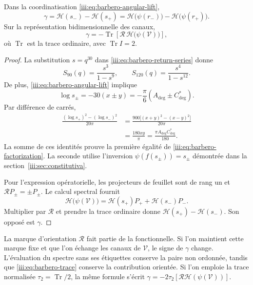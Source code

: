 \begin{theorem}
\label{iii:thm:barbero-factorization}
Dans la coordinatisation \eqref{iii:eq:barbero-angular-lift},
\begin{equation}
 \gamma=\mathcal H(s_-)-\mathcal H(s_+)
       =\mathcal H\bigl(\psi(r_-)\bigr)
        -\mathcal H\bigl(\psi(r_+)\bigr).
 \label{iii:eq:barbero-factorization}
\end{equation}
Sur la représentation bidimensionnelle des canaux,
\begin{equation}
 \gamma=-\operatorname{Tr}
    \left[\mathcal R\,\mathcal H\bigl(\psi(\mathcal V)\bigr)\right],
 \label{iii:eq:barbero-trace}
\end{equation}
où $\operatorname{Tr}$ est la trace ordinaire, avec
$\operatorname{Tr}I=2$.
\end{theorem}
\begin{proof}
La substitution $s=q^{30}$ dans \eqref{iii:eq:barbero-return-series} donne
\[
 S_{90}(q)=\frac{s^3}{1-s^9},\qquad
 S_{120}(q)=\frac{s^4}{1-s^{12}}.
\]
De plus, \eqref{iii:eq:barbero-angular-lift} implique
\[
 \log s_\pm=-30(x\pm y)
 =-\frac\pi6(A_{\deg}\pm C^*_{\deg}).
\]
Par différence de carrés,
\begin{align}
 \frac{(\log s_+)^2-(\log s_-)^2}{20\pi}
 &=\frac{900\bigl[(x+y)^2-(x-y)^2\bigr]}{20\pi}\\
 &=\frac{180xy}{\pi}
 =\frac{\pi A_{\deg}C^*_{\deg}}{180}.
 \label{iii:eq:barbero-log-term}
\end{align}
La somme de ces identités prouve la première égalité de
\eqref{iii:eq:barbero-factorization}. La seconde utilise l’inversion
$\psi(f(s_\pm))=s_\pm$ démontrée dans la
section~\ref{iii:sec:constitutiva}.

Pour l’expression opératorielle, les projecteurs de feuillet sont de rang un et
$\mathcal RP_\pm=\pm P_\pm$. Le calcul spectral fournit
\[
 \mathcal H\bigl(\psi(\mathcal V)\bigr)
 =\mathcal H(s_+)P_++\mathcal H(s_-)P_-.
\]
Multiplier par $\mathcal R$ et prendre la trace ordinaire donne
$\mathcal H(s_+)-\mathcal H(s_-)$. Son opposé est $\gamma$.
\end{proof}

La marque d’orientation $\mathcal R$ fait partie de la fonctionnelle. Si
l’on maintient cette marque fixe et que l’on échange les canaux de $\mathcal V$,
le signe de $\gamma$ change. L’évaluation du spectre sans ses étiquettes conserve
la paire non ordonnée, tandis que \eqref{iii:eq:barbero-trace} conserve la
contribution orientée. Si l’on emploie la trace normalisée
$\tau_2=\operatorname{Tr}/2$, la même formule s’écrit
$\gamma=-2\tau_2[\mathcal R\mathcal H(\psi(\mathcal V))]$.

